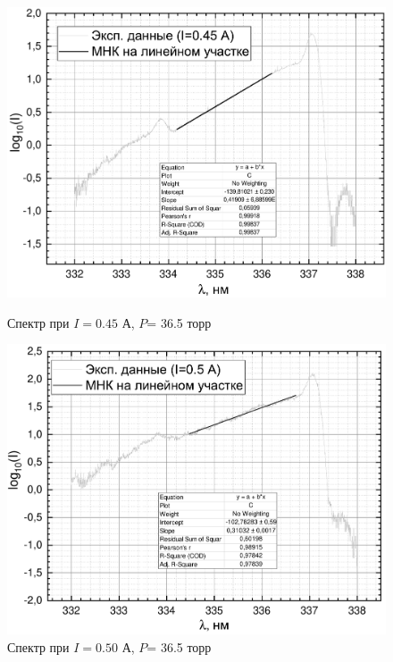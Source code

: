 \begin{figure}[H]
	\begin{minipage}{0.45\linewidth}
		\centering
		\includegraphics[width=\linewidth]{data/graph_I=0,45_polosa}
		\caption{Спектр при $I= 0.45$ А, $P$= 36.5 торр}
		\label{polosa_45}
	\end{minipage} 
	\hfill
	\begin{minipage}[H]{0.45\linewidth}
		\centering
		\includegraphics[width=\linewidth]{data/graph_I=0,50_polosa}
		\caption{Спектр при $I= 0.50 $ А, $P$= 36.5 торр}
		\label{polosa_50}
	\end{minipage}
	\begin{minipage}{0.45\linewidth}
		\centering

\end{minipage}
\end{figure}
